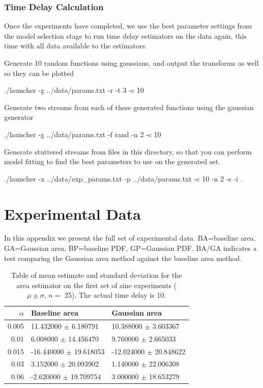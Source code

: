 \documentclass[a4paper,11pt]{article}
\begin{document}
\begin{appendices}
\subsubsection{Time Delay Calculation}
\label{sec-10-2-5}

Once the experiments have completed, we use the best parameter settings from the
model selection stage to run time delay estimators on the data again, this time
with all data available to the estimators.


   Generate 10 random functions using gaussians, and output the transforms as
   well so they can be plotted
   \begin{verbatimtab}
   ./launcher -g ../data/params.txt -r -t 3 -c 10
   \end{verbatimtab}
   Generate two streams from each of these generated functions using the
   gaussian generator
   \begin{verbatimtab}
   ./launcher -g ../data/params.txt -f rand -n 2 -c 10
   \end{verbatimtab}
   Generate stuttered streams from files in this directory, so that you can
   perform model fitting to find the best parameters to use on the generated
   set.
   \begin{verbatimtab}
   ./launcher -x ../data/exp_params.txt -p ../data/params.txt -c 10 -n 2 -s -i .
   \end{verbatimtab}
\section{Experimental Data}
\label{sec-11}

In this appendix we present the full set of experimental data. BA=baseline area,
GA=Gaussian area, BP=baseline PDF, GP=Gaussian PDF. BA/GA indicates a test
comparing the Gaussian area method against the baseline area method.
\begin{table}[htb]
\caption{Table of mean estimate and standard deviation for the area estimator on the first set of sine experiments ($\mu\pm\sigma,\, n=$ 25). The actual time delay is 10.} 
\begin{center}
\begin{tabular}{r|ll}
 $\alpha$  &  Baseline area               &  Gaussian area               \\
\hline
    0.005  &  11.432000 $\pm$ 6.180791    &  10.388000 $\pm$ 3.603367    \\
     0.01  &  6.008000 $\pm$ 14.456470    &  9.760000 $\pm$ 2.665033     \\
    0.015  &  -16.440000 $\pm$ 19.618053  &  -12.024000 $\pm$ 20.848622  \\
     0.03  &  3.152000 $\pm$ 20.093902    &  1.140000 $\pm$ 22.006308    \\
     0.06  &  -2.620000 $\pm$ 19.709754   &  3.000000 $\pm$ 18.653279    \\
\end{tabular}
\end{center}
\end{table}



\end{appendices}
\end{document}
